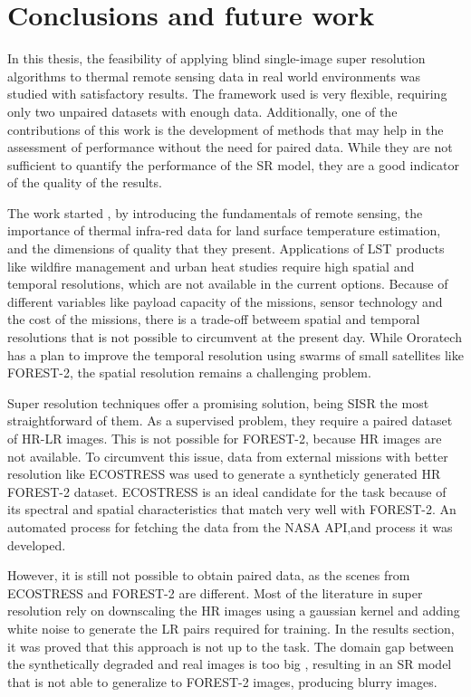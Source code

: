\section{Conclusions and future work}

In this thesis, the feasibility of applying blind single-image super resolution algorithms to thermal remote sensing data in real world environments was studied with satisfactory results. The framework used is very flexible, requiring only two unpaired datasets with enough data. Additionally, one of the contributions of this work is the development of methods that may help in the assessment of performance without the need for paired data. While they are not sufficient to quantify the performance of the SR model, they are a good indicator of the quality of the results.

The work started , by introducing the fundamentals of remote sensing, the importance of thermal infra-red data for land surface temperature estimation, and the dimensions of quality that they present.
Applications of LST products like wildfire management and urban heat studies require high spatial and temporal resolutions, which are not available in the current options. 
Because of different variables like payload capacity of the missions, sensor technology and the cost of the missions, there is a trade-off betweem spatial and temporal resolutions that is not possible to circumvent at the present day.
While Ororatech has a plan to improve the temporal resolution using swarms of small satellites like FOREST-2, the spatial resolution remains a challenging problem.

Super resolution techniques offer a promising solution, being SISR the most straightforward of them. As a supervised problem, they require a paired dataset of HR-LR images. This is not possible for FOREST-2, because HR images are not available.
To circumvent this issue, data from external missions with better resolution like ECOSTRESS was used to generate a syntheticly generated HR FOREST-2 dataset. ECOSTRESS is an ideal candidate for the task because of its spectral and spatial characteristics that match very well with FOREST-2.
An automated process for fetching the data from the NASA API,and process it was developed.

However, it is still not possible to obtain paired data, as the scenes from ECOSTRESS and FOREST-2 are different. Most of the literature in super resolution rely on downscaling the HR images using a gaussian kernel and adding white noise to generate the LR pairs required for training. 
In the results section, it was proved that this approach is not up to the task. The domain gap between the synthetically degraded and real images is too big , resulting in an SR model that is not able to generalize to FOREST-2 images, producing blurry images.

